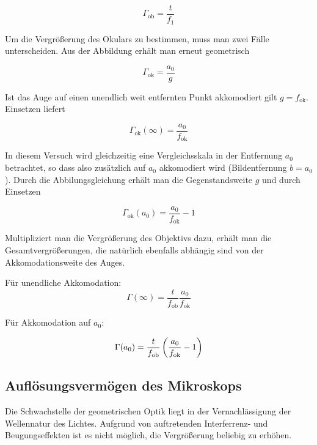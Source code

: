 \documentclass[a4paper,german,12pt,smallheadings]{scrartcl}
\begin{document}
\begin{equation}
  \Gamma_\text{ob} = \frac{t}{f_1}
\end{equation}


Um die Vergrößerung des Okulars zu bestimmen, muss man zwei Fälle
unterscheiden. Aus der Abbildung erhält man erneut geometrisch

\begin{equation}
  \Gamma_\text{ok} = \frac{a_0}{g}
\end{equation}

Ist das Auge auf einen unendlich weit entfernten Punkt akkomodiert gilt $g =
f_\text{ok}$. Einsetzen liefert

\begin{equation}
  \Gamma_\text{ok}(\infty) = \frac{a_0}{f_\text{ok}}
\end{equation}

In diesem Versuch wird gleichzeitig eine Vergleichsskala in der Entfernung
$a_0$ betrachtet, so dass also zusätzlich auf $a_0$ akkomodiert wird
(Bildentfernung $b = a_0$). Durch die Abbilungsgleichung erhält man die
Gegenstandsweite $g$ und durch Einsetzen

\begin{equation}
  \Gamma_\text{ok}(a_0) = \frac{a_0}{f_\text{ok}} - 1
\end{equation}

Multipliziert man die Vergrößerung des Objektivs dazu, erhält man die
Gesamtvergrößerungen, die natürlich ebenfalls abhängig sind von der
Akkomodationsweite des Auges.

Für unendliche Akkomodation:
\begin{equation}
  \Gamma(\infty) = \frac{t}{f_\text{ob}} \frac{a_0}{f_\text{ok}}
\end{equation}

Für Akkomodation auf $a_0$:

\begin{equation}
  \Gamma(a_0) = \frac{t}{f_\text{ob}} \del{\frac{a_0}{f_\text{ok}} - 1}
\end{equation}

\subsection{Auflösungsvermögen des Mikroskops}

Die Schwachstelle der geometrischen Optik liegt in der Vernachlässigung der
Wellennatur des Lichtes. Aufgrund von auftretenden Interferrenz- und
Beugungseffekten ist es nicht möglich, die Vergrößerung beliebig zu erhöhen.
\end{document}
